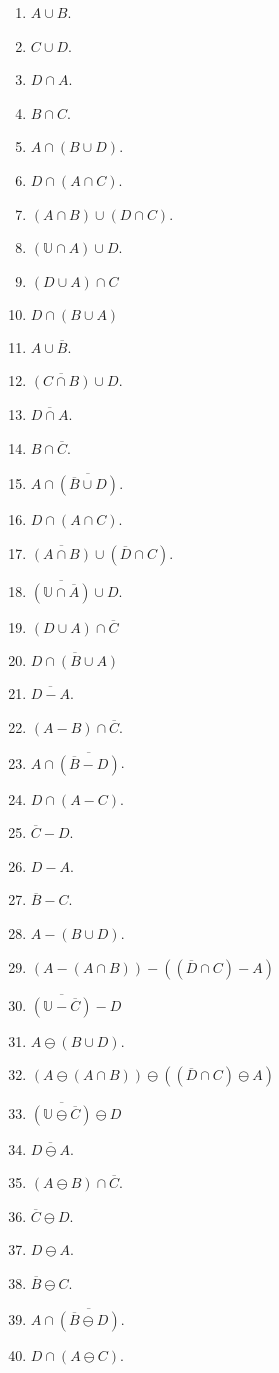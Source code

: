 \begin{enumerate}
	\item $A \cup B$.
	\item $C \cup D$.
	\item $D \cap A$.
	\item $B \cap C$.
	\item $A \cap (B \cup D)$.
	\item $D \cap (A \cap C)$.
	\item $(A \cap B) \cup (D \cap C)$.
	\item $(\mathbb{U} \cap A) \cup D$.
	\item $(D \cup A) \cap C$
	\item $D \cap (B \cup A)$
	\item $A \cup \overline{B}$.
	\item $\overline{(C \cap B)} \cup D$.
	\item $\overline{D \cap A}$.
	\item $B \cap \overline{C}$.
	\item $A \cap \overline{(\overline{B} \cup D)}$.
	\item $D \cap (A \cap C)$.
	\item $\overline{(A \cap B)} \cup (\overline{D} \cap C)$.
	\item $\overline{(\mathbb{U} \cap \overline{A})} \cup D$.
	\item $(D \cup A) \cap \overline{C}$
	\item $\overline{D \cap (B \cup A)}$
	\item $\overline{D - A}$.
	\item $(A - B) \cap \overline{C}$.
	\item $A \cap \overline{(\overline{B} - D)}$.
	\item $D \cap (A - C)$.
	\item $\overline{C} - D$.
	\item $D - A$.
	\item $\overline{B} - C$.
	\item $A - (B \cup D)$.
	\item $(A - (A \cap B)) - ((\overline{D} \cap C) - A)$
	\item $\overline{(\mathbb{U} - \overline{C})} - D$
	\item $A \ominus (B \cup D)$.
	\item $(A \ominus (A \cap B)) \ominus ((\overline{D} \cap C) \ominus A)$
	\item $\overline{(\mathbb{U} \ominus \overline{C})} \ominus D$
	\item $\overline{D \ominus A}$.
	\item $(A \ominus B) \cap \overline{C}$.
	\item $\overline{C} \ominus D$.
	\item $D \ominus A$.
	\item $\overline{B} \ominus C$.
	\item $A \cap \overline{(\overline{B} \ominus D)}$.
	\item $D \cap (A \ominus C)$.
\end{enumerate}

